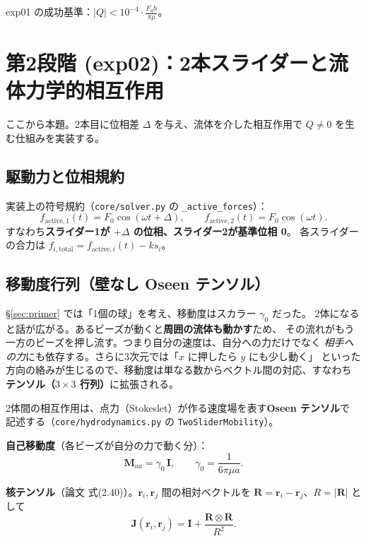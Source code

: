 \documentclass[11pt,a4paper]{article}
\newcommand{\rv}{\bm{r}}
\newcommand{\Maa}{\bm{M}_{aa}}
\newcommand{\gamz}{\gamma_{0}}
\begin{document}
\noindent exp01 の成功基準：$\displaystyle |Q|<10^{-4}\cdot\frac{F_0 h}{\pi\mu}$。

\section{第2段階 (exp02)：2本スライダーと流体力学的相互作用}

ここから本題。2本目に位相差 $\Delta$ を与え、流体を介した相互作用で
$Q\neq0$ を生む仕組みを実装する。

\subsection{駆動力と位相規約}

実装上の符号規約（\texttt{core/solver.py} の \texttt{\_active\_forces}）：
\begin{equation}
f_{\mathrm{active},1}(t)=F_0\cos(\omega t+\Delta),\qquad
f_{\mathrm{active},2}(t)=F_0\cos(\omega t).
\end{equation}
すなわち\textbf{スライダー1が $+\Delta$ の位相、スライダー2が基準位相 0}。
各スライダーの合力は $f_{i,\mathrm{total}}=f_{\mathrm{active},i}(t)-k s_i$。

\subsection{移動度行列（壁なし Oseen テンソル）}

§\ref{sec:primer} では「1個の球」を考え、移動度はスカラー $\gamz$ だった。
2体になると話が広がる。あるビーズが動くと\textbf{周囲の流体も動かす}ため、
その流れがもう一方のビーズを押し流す。つまり自分の速度は、自分への力だけでなく
\emph{相手への力}にも依存する。さらに3次元では「$x$ に押したら $y$ にも少し動く」
といった方向の絡みが生じるので、移動度は単なる数からベクトル間の対応、すなわち
\textbf{テンソル（$3\times3$ 行列）}に拡張される。

2体間の相互作用は、点力（Stokeslet）が作る速度場を表す\textbf{Oseen テンソル}で
記述する（\texttt{core/hydrodynamics.py} の \texttt{TwoSliderMobility}）。

\textbf{自己移動度}（各ビーズが自分の力で動く分）：
\begin{equation}
\Maa=\gamz\,\bm I,\qquad \gamz=\frac{1}{6\pi\mu a}.
\end{equation}

\textbf{核テンソル}（論文 式(2.40)）。$\rv_i,\rv_j$ 間の相対ベクトルを
$\bm R=\rv_i-\rv_j$、$R=|\bm R|$ として
\begin{equation}
\bm J(\rv_i,\rv_j)=\bm I+\frac{\bm R\otimes\bm R}{R^2}.
\end{equation}
\end{document}
